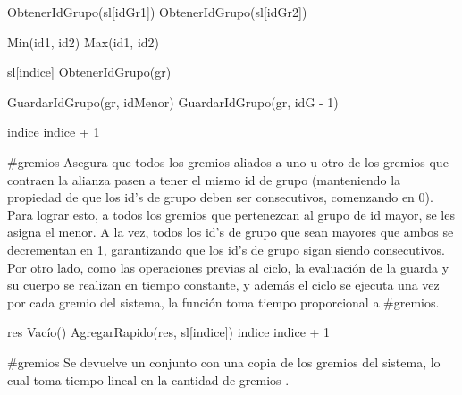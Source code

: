 {
	\state {} \asig ObtenerIdGrupo(sl[idGr1])						
	\state {} \asig ObtenerIdGrupo(sl[idGr2])						
	\state 

													
		
		\state {} \asig Min(id1, id2)						
		\state {} \asig Max(id1, id2)						
		\state

		\state {} 										

										
			\state

			\state {} \asig sl[indice]					
			\state {} \asig ObtenerIdGrupo(gr)					
			\state

															
				\state GuardarIdGrupo(gr, idMenor)								
			\Else {}										
					\state GuardarIdGrupo(gr, idG - 1)							
				\endif
			\endif
			\state

			\state indice \asig indice + 1										
		\endwhile
	
		
	\endif
}
{\#gremios}
{ Asegura que todos los gremios aliados a uno u otro de los gremios que contraen la alianza pasen a tener el mismo id de grupo (manteniendo la propiedad de que los id's de grupo deben ser consecutivos, comenzando en 0). \\
Para lograr esto, a todos los gremios que pertenezcan al grupo de id mayor, se les asigna el menor. A la vez, todos los id's de grupo que sean mayores que ambos se decrementan en 1, garantizando que los id's de grupo sigan siendo consecutivos.
\hspace{10pt} Por otro lado, como las operaciones previas al ciclo, la evaluaci\'on de la guarda y su cuerpo se realizan en tiempo constante, y adem\'as el ciclo se ejecuta una vez por cada gremio del sistema, la funci\'on toma tiempo proporcional a \#gremios. }

{
	\state res \asig Vac\'io() 
	\state {} 					
	\state 	
						
		\state 
		\state AgregarRapido(res, sl[indice])				
		\state
		\state indice \asig indice + 1					
	\endwhile

}
{\#gremios}
{ Se devuelve un conjunto con una copia de los gremios del sistema, lo cual toma tiempo lineal en la cantidad de gremios . }

